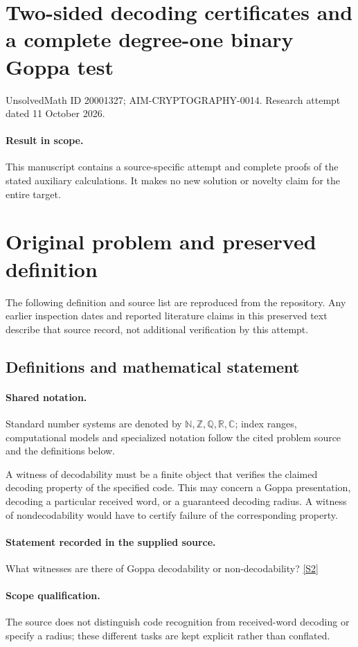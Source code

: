 \documentclass[11pt]{article}
\begin{document}
\section*{Two-sided decoding certificates and a complete degree-one binary Goppa test}
\noindent UnsolvedMath ID 20001327; AIM-CRYPTOGRAPHY-0014. Research attempt dated 11 October 2026.
\paragraph{Result in scope.}This manuscript contains a source-specific attempt and complete proofs of the stated auxiliary calculations. It makes no new solution or novelty claim for the entire target.
\section{Original problem and preserved definition}
The following definition and source list are reproduced from the repository. Any earlier inspection dates and reported literature claims in this preserved text describe that source record, not additional verification by this attempt.
\subsection{Definitions and mathematical statement}

\paragraph{Shared notation.}Standard number systems are denoted by $\mathbb N,\mathbb Z,\mathbb Q,\mathbb R,\mathbb C$; index ranges, computational models and specialized notation follow the cited problem source and the definitions below.


A witness of decodability must be a finite object that verifies the claimed decoding property of the specified code. This may concern a Goppa presentation, decoding a particular received word, or a guaranteed decoding radius. A witness of nondecodability would have to certify failure of the corresponding property.
\paragraph{Statement recorded in the supplied source.}
What witnesses are there of Goppa decodability or non-decodability? \href{http://aimpl.org/quantumalg/1/}{[S2]}
\paragraph{Scope qualification.}
The source does not distinguish code recognition from received-word decoding or specify a radius; these different tasks are kept explicit rather than conflated.
\end{document}
